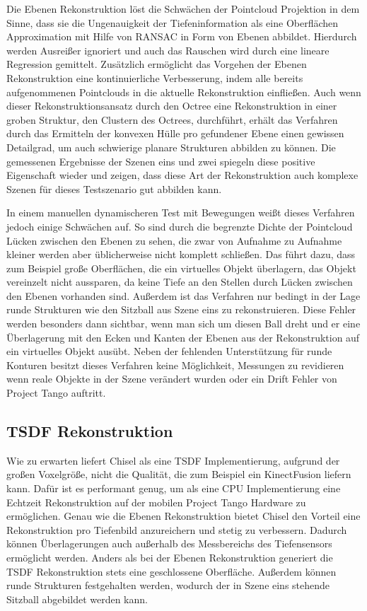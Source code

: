 Die Ebenen Rekonstruktion löst die Schwächen der Pointcloud Projektion in dem Sinne, dass sie die Ungenauigkeit der Tiefeninformation als eine Oberflächen Approximation mit Hilfe von RANSAC in Form von Ebenen abbildet. Hierdurch werden Ausreißer ignoriert und auch das Rauschen wird durch eine lineare Regression gemittelt. Zusätzlich ermöglicht das Vorgehen der Ebenen Rekonstruktion eine kontinuierliche Verbesserung, indem alle bereits aufgenommenen Pointclouds in die aktuelle Rekonstruktion einfließen. Auch wenn dieser Rekonstruktionsansatz durch den Octree eine Rekonstruktion in einer groben Struktur, den Clustern des Octrees, durchführt, erhält das Verfahren durch das Ermitteln der konvexen Hülle pro gefundener Ebene einen gewissen Detailgrad, um auch schwierige planare Strukturen abbilden zu können. Die gemessenen Ergebnisse der Szenen eins und zwei spiegeln diese positive Eigenschaft wieder und zeigen, dass diese Art der Rekonstruktion auch komplexe Szenen für dieses Testszenario gut abbilden kann.

In einem manuellen dynamischeren Test mit Bewegungen weißt dieses Verfahren jedoch einige Schwächen auf. So sind durch die begrenzte Dichte der Pointcloud Lücken zwischen den Ebenen zu sehen, die zwar von Aufnahme zu Aufnahme kleiner werden aber üblicherweise nicht komplett schließen. Das führt dazu, dass zum Beispiel große Oberflächen, die ein virtuelles Objekt überlagern, das Objekt vereinzelt nicht aussparen, da keine Tiefe an den Stellen durch Lücken zwischen den Ebenen vorhanden sind. Außerdem ist das Verfahren nur bedingt in der Lage runde Strukturen wie den Sitzball aus Szene eins zu rekonstruieren. Diese Fehler werden besonders dann sichtbar, wenn man sich um diesen Ball dreht und er eine Überlagerung mit den Ecken und Kanten der Ebenen aus der Rekonstruktion auf ein virtuelles Objekt ausübt. Neben der fehlenden Unterstützung für runde Konturen besitzt dieses Verfahren keine Möglichkeit, Messungen zu revidieren wenn reale Objekte in der Szene verändert wurden oder ein Drift Fehler von Project Tango auftritt.

\subsection*{TSDF Rekonstruktion}

Wie zu erwarten liefert Chisel als eine TSDF Implementierung, aufgrund der großen Voxelgröße, nicht die Qualität, die zum Beispiel ein KinectFusion liefern kann. Dafür ist es performant genug, um als eine CPU Implementierung eine Echtzeit Rekonstruktion auf der mobilen Project Tango Hardware zu ermöglichen. Genau wie die Ebenen Rekonstruktion bietet Chisel den Vorteil eine Rekonstruktion pro Tiefenbild anzureichern und stetig zu verbessern. Dadurch können Überlagerungen auch außerhalb des Messbereichs des Tiefensensors ermöglicht werden. Anders als bei der Ebenen Rekonstruktion generiert die TSDF Rekonstruktion stets eine geschlossene Oberfläche. Außerdem können runde Strukturen festgehalten werden, wodurch der in Szene eins stehende Sitzball abgebildet werden kann. 

